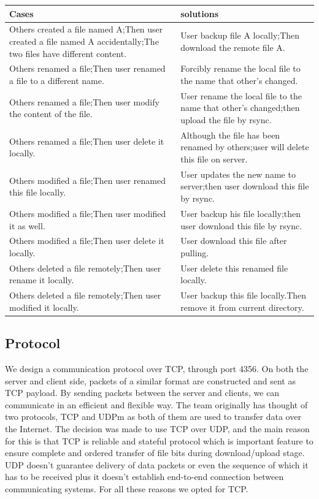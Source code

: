 \documentclass{article}
\begin{document}
\begin{center}
\begin{tabular}{ | m{5cm}| m{6cm} | }
\hline
\textbf{Cases} & \textbf{solutions}  \\
\hline
Others created a file named A;Then user created a file named A accidentally;The two files have different content. & User backup file A locally;Then download the remote file A.  \\
\hline
Others renamed a file;Then user renamed a file to a different name. & Forcibly rename the local file to the name that other’s changed.  \\
\hline
Others renamed a file;Then user modify the content of the file. & User rename the local file to the name that other’s changed;then upload the file by rsync. \\
\hline
Others renamed a file;Then user delete it locally. & Although the file has been renamed by others;user will delete this file on server. \\
\hline
Others modified a file;Then user renamed this file locally. & User updates the new name to server;then user download this file by rsync. \\
\hline
Others modified a file;Then user modified it as well. & User backup his file locally;then user download this file by rsync. \\
\hline
Others modified a file;Then user delete it locally. & User download this file after pulling. \\
\hline
Others deleted a file remotely;Then user rename it locally.  & User delete this renamed file locally. \\
\hline
Others deleted a file remotely;Then user modified it locally.  & User backup this file locally.Then remove it from current directory. \\
\hline
\end{tabular}
\end{center}

\subsection{Protocol}

We design a communication protocol over TCP, through port 4356. On both the server and client side, packets of a similar format are constructed and sent as TCP payload. By sending packets between the server and clients, we can communicate in an efficient and flexible way.
\newline
\hfill \break
 The team originally has thought of two protocols, TCP and UDPm as both of them are used to transfer data over the Internet. The decision was made to use TCP over UDP, and the main reason for this is that TCP is reliable and stateful protocol which is important feature to ensure complete and ordered transfer of file bits during download/upload stage. UDP doesn’t guarantee delivery of data packets or even the sequence of which it has to be received plus it doesn’t establish end-to-end connection between communicating systems. For all these reasons we opted for TCP.
\end{document}
